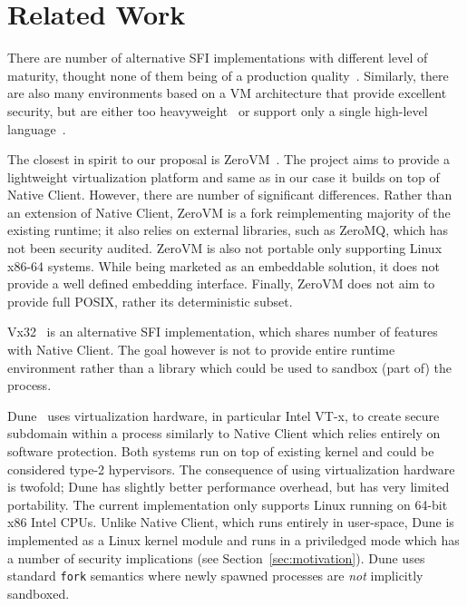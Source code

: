 \section{Related Work}
\label{sec:related}

There are number of alternative SFI implementations with different level
of maturity, thought none of them being of a production
quality~\cite{small:coots97,mccamant:usenix-sec06,ford:usenix-atc08}.
Similarly, there are also many environments based on a VM architecture
that provide excellent security, but are either too
heavyweight~\cite{adl-tabatabai:pldi96,bugnion:tocs97,waldspurger:osdi02,barham:sosp03,ford:fast05}
or support only a single high-level
language~\cite{lindholm:java99,richter:clr10}.

The closest in spirit to our proposal is ZeroVM~\cite{zerovm}. The
project aims to provide a lightweight virtualization platform and same
as in our case it builds on top of Native Client.  However, there are
number of significant differences. Rather than an extension of Native
Client, ZeroVM is a fork reimplementing majority of the existing
runtime; it also relies on external libraries, such as \mbox{ZeroMQ},
which has not been security audited. ZeroVM is also not portable only
supporting Linux x86-64 systems. While being marketed as an embeddable
solution, it does not provide a well defined embedding interface.
Finally, ZeroVM does not aim to provide full POSIX, rather its
deterministic subset.

Vx32~\cite{ford:usenix-atc08} is an alternative SFI implementation,
which shares number of features with Native Client. The goal however is
not to provide entire runtime environment rather than a library which
could be used to sandbox (part of) the process.

Dune~\cite{belay:osdi12} uses virtualization hardware, in particular
Intel VT-x, to create secure subdomain within a process similarly to
Native Client which relies entirely on software protection. Both systems
run on top of existing kernel and could be considered type-2
hypervisors. The consequence of using virtualization hardware is
twofold; Dune has slightly better performance overhead, but has very
limited portability. The current implementation only supports Linux
running on 64-bit x86 Intel CPUs. Unlike Native Client, which runs
entirely in user-space, Dune is implemented as a Linux kernel module and
runs in a priviledged mode which has a number of security implications
(see Section~\ref{sec:motivation}). Dune uses standard \lstinline`fork`
semantics where newly spawned processes are \emph{not} implicitly
sandboxed.

